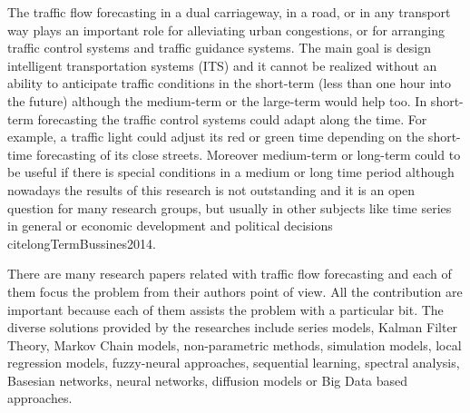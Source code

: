 \documentclass[preprint]{elsarticle}
\begin{document}
The traffic flow forecasting in a dual carriageway, in a road, or in any transport way plays an important role for alleviating urban congestions, or for arranging traffic control systems and traffic guidance systems. The main goal is design intelligent transportation systems (ITS) and it cannot be realized without an ability to anticipate traffic conditions in the short-term (less than one hour into the future) although the medium-term or the large-term would help too. In short-term forecasting the traffic control systems could adapt along the time. For example, a traffic light could adjust its red or green time depending on the short-time forecasting of its close streets. Moreover medium-term or long-term could to be useful if there is special conditions in a medium or long time period although nowadays the results of this research is not outstanding and it is an open question for many research groups, but usually in other subjects like time series in general \cite{ParrasGutierrez2014433} or economic development and political decisions 	cite{longTermBussines2014}.



There are many research papers related with traffic flow forecasting and each of them focus the problem from their authors point of view. All the contribution are important because each of them assists the problem with a particular bit. The diverse solutions provided by the researches include \cite{SurveyKumar2007} series models, Kalman Filter Theory, Markov Chain models, non-parametric methods, simulation models, local regression models, fuzzy-neural approaches, sequential learning, spectral analysis, Basesian networks, neural networks, diffusion models or Big Data based approaches.  %
\end{document}
